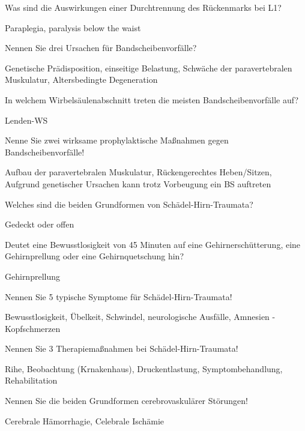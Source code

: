 \documentclass[10pt, a4paper]{exam}
\begin{document}
\begin{questions}
  \question Was sind die Auswirkungen einer Durchtrennung des Rückenmarks bei L1?
  \begin{solution}
    Paraplegia, paralysis below the waist
  \end{solution}

  \question Nennen Sie drei Ursachen für Bandscheibenvorfälle?
  \begin{solution}
    Genetische Prädisposition, einseitige Belastung, Schwäche der paravertebralen Muskulatur, Altersbedingte Degeneration
  \end{solution}

  \question In welchem Wirbelsäulenabschnitt treten die meisten Bandscheibenvorfälle auf?
  \begin{solution}
    Lenden-WS
  \end{solution}

  \question Nenne Sie zwei wirksame prophylaktische Maßnahmen gegen Bandscheibenvorfälle!
  \begin{solution}
    Aufbau der paravertebralen Muskulatur, Rückengerechtes Heben/Sitzen, Aufgrund genetischer Ursachen kann trotz Vorbeugung ein BS auftreten
  \end{solution}

  \question Welches sind die beiden Grundformen von Schädel-Hirn-Traumata?
  \begin{solution}
    Gedeckt oder offen
  \end{solution}

  \question Deutet eine Bewusstlosigkeit von 45 Minuten auf eine Gehirnerschütterung, eine Gehirnprellung oder eine Gehirnquetschung hin?
  \begin{solution}
    Gehirnprellung
  \end{solution}

  \question Nennen Sie 5 typische Symptome für Schädel-Hirn-Traumata!
  \begin{solution}
    Bewusstlosigkeit, Übelkeit, Schwindel, neurologische Ausfälle, Amnesien
    - Kopfschmerzen
  \end{solution}

  \question Nennen Sie 3 Therapiemaßnahmen bei Schädel-Hirn-Traumata!
  \begin{solution}
    Rihe, Beobachtung (Krnakenhaus), Druckentlastung, Symptombehandlung, Rehabilitation
  \end{solution}

  \question Nennen Sie die beiden Grundformen cerebrovaskulärer Störungen!
  \begin{solution}
    Cerebrale Hämorrhagie, Celebrale Ischämie
  \end{solution}


\end{questions}
\end{document}

